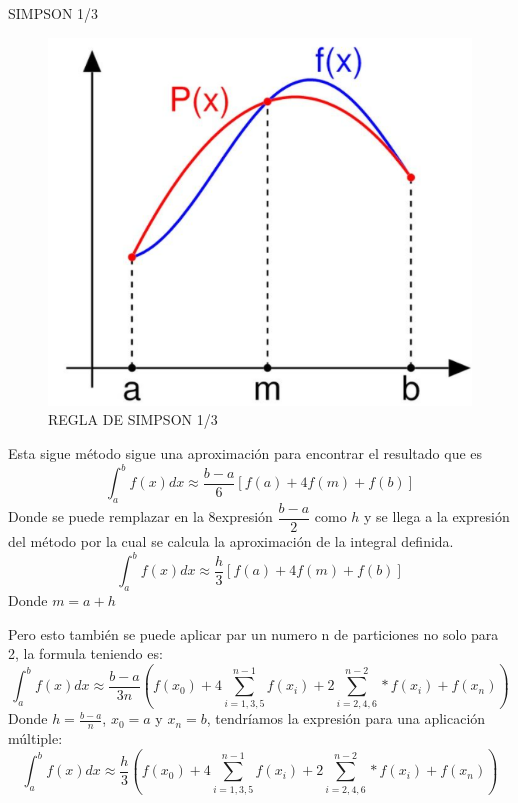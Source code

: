 \documentclass[11pt]{beamer}
\begin{document}
		\begin{frame}{SIMPSON 1/3}
			\begin{figure}[H]
				\centering
				\includegraphics[scale=0.4]{11.png}
				\caption{REGLA DE SIMPSON 1/3}
				\centering
			\end{figure}
		\end{frame}

		\begin{frame}
			Esta sigue método sigue una aproximación para encontrar el resultado que es
			$$\int_{a}^{b} f(x)dx \approx \dfrac{b-a}{6}[f(a) + 4f(m) + f(b)]$$
			Donde se puede remplazar en la 8expresión $\dfrac{b-a}{2}$ como $h$ y se llega a la expresión 
			del método por la cual se calcula la aproximación de la integral definida.
			$$\int_{a}^{b} f(x)dx \approx \dfrac{h}{3}[f(a) + 4f(m) + f(b)]$$
			Donde $ m = a + h $
		\end{frame}

		\begin{frame}
			Pero esto también se puede aplicar par un numero n de particiones no solo para 2, la formula 
			teniendo es:
			$$ \int_{a}^{b} f(x)dx \approx \frac{b-a}{3n}\left(f(x_0) + 4\sum_{i=1,3,5}^{n-1}f(x_i) + 2\sum_{i=2,4,6}^{n-2}*f(x_i) + f(x_n)\right)$$
			Donde $ h = \frac{b-a}{n} $, $x_0 = a $ y $ x_n = b $, tendríamos la expresión para una aplicación múltiple:
			$$ \int_{a}^{b} f(x)dx \approx \frac{h}{3}\left(f(x_0) + 4\sum_{i=1,3,5}^{n-1}f(x_i) + 2\sum_{i=2,4,6}^{n-2}*f(x_i) + f(x_n)\right)$$
		\end{frame}
\end{document}
